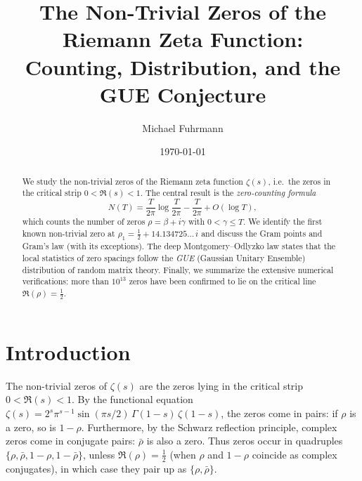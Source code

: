 \documentclass[12pt,a4paper]{amsart}
\theoremstyle{definition}
\begin{document}

\title{The Non-Trivial Zeros of the Riemann Zeta Function:\\
       Counting, Distribution, and the GUE Conjecture}

\author{Michael Fuhrmann}
\address{Specialist Mathematics Project, Build 84}
\date{\today}

\begin{abstract}
We study the non-trivial zeros of the Riemann zeta function $\zeta(s)$,
i.e.\ the zeros in the critical strip $0 < \Re(s) < 1$.
The central result is the \emph{zero-counting formula}
\[
  N(T) = \frac{T}{2\pi}\log\frac{T}{2\pi} - \frac{T}{2\pi} + O(\log T),
\]
which counts the number of zeros $\rho = \beta + i\gamma$ with
$0 < \gamma \le T$.
We identify the first known non-trivial zero at
$\rho_1 = \tfrac{1}{2} + 14.134725\ldots\,i$ and discuss
the Gram points and Gram's law (with its exceptions).
The deep Montgomery--Odlyzko law states that the local statistics of
zero spacings follow the \emph{GUE} (Gaussian Unitary Ensemble)
distribution of random matrix theory.
Finally, we summarize the extensive numerical verifications: more than
$10^{13}$ zeros have been confirmed to lie on the critical line $\Re(\rho)=\tfrac{1}{2}$.
\end{abstract}

\maketitle
\tableofcontents

\section{Introduction}

The non-trivial zeros of $\zeta(s)$ are the zeros lying in the critical
strip $0 < \Re(s) < 1$.  By the functional equation
$\zeta(s) = 2^s \pi^{s-1} \sin(\pi s/2)\,\Gamma(1-s)\,\zeta(1-s)$,
the zeros come in pairs: if $\rho$ is a zero, so is $1 - \rho$.  Furthermore, by the Schwarz reflection principle,
complex zeros come in conjugate pairs: $\bar\rho$ is also a zero.
Thus zeros occur in quadruples $\{\rho, \bar\rho, 1-\rho, 1-\bar\rho\}$,
unless $\Re(\rho) = \tfrac{1}{2}$ (when $\rho$ and $1-\rho$ coincide as
complex conjugates), in which case they pair up as $\{\rho, \bar\rho\}$.
\end{document}
